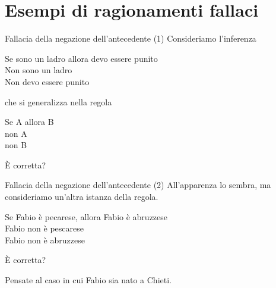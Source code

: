 \documentclass[aspectratio=169,10pt,dvipsnames,handout]{beamer}
\begin{document}
\section{Esempi di ragionamenti fallaci}

\begin{frame}{Fallacia della negazione dell'antecedente (1)}
	Consideriamo l'inferenza
	\begin{center}
		\begin{inference}
			Se sono un ladro allora devo essere punito\\
			Non sono un ladro\\
			\hline
			Non devo essere punito
		\end{inference}
	\end{center}
	che si generalizza nella regola
	\begin{center}
		\begin{inference}
			Se A allora B\\
			non A\\
			\hline
			non B
		\end{inference}
	\end{center}
	È corretta?
\end{frame}

\begin{frame}{Fallacia della negazione dell'antecedente (2)}
	All'apparenza lo sembra, ma consideriamo un'altra istanza della regola.
	\begin{center}
		\begin{inference}
			Se Fabio è pecarese, allora Fabio è abruzzese \only<3->{\checkmark}\\
			Fabio non è pescarese \only<4->{\checkmark}\\
			\hline
			Fabio non è abruzzese \only<5->{\xmark}
		\end{inference}
	\end{center}
	È corretta?

	\pause
	\medskip
	Pensate al caso in cui Fabio sia nato a Chieti.

\end{frame}
\end{document}

